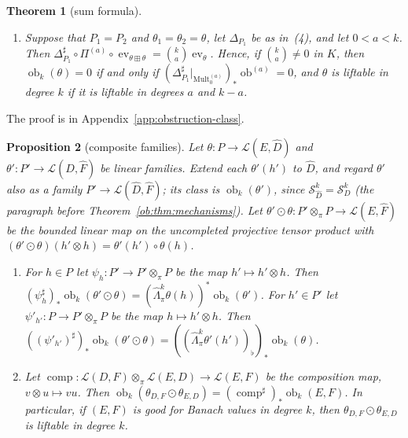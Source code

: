 \documentclass[11pt]{amsart}
\newtheorem{theorem}{Theorem}[section]
\newtheorem{proposition}[theorem]{Proposition}
\theoremstyle{definition}
\theoremstyle{remark}
\numberwithin{equation}{section}
\newcommand{\cL}{\mathcal L}
\newcommand{\Mult}{\operatorname{Mult}}
\theoremstyle{plain}
\theoremstyle{definition}
\theoremstyle{plain}
\newcommand{\ev}{\operatorname{ev}}
\newcommand{\ob}{\operatorname{ob}}
\newcommand{\cS}{\mathcal S}
\begin{document}
\begin{theorem}[sum formula]
\begin{enumerate}
$a$, then $\theta_1+\theta_2=(\theta_1\boxplus\theta_2)\circ\Delta_{P_1}$ is liftable in degree $k$. In particular,
$\theta_1+\theta_2$ is liftable in degree $k$ if $\theta_1$ and $\theta_2$ are liftable in every degree at most $k$.
\item Suppose that $P_1=P_2$ and $\theta_1=\theta_2=\theta$, let $\Delta_{P_1}$ be as in~(4), and let $0<a<k$. Then
$\Delta_{P_1}^\sharp\circ\Pi^{(a)}\circ\ev_{\theta\boxplus\theta}=\binom ka\ev_\theta$. Hence, if $\binom ka\ne0$ in $K$, then
$\ob_k(\theta)=0$ if and only if $(\Delta_{P_1}^\sharp|_{\Mult^{(a)}_0})_*\ob^{(a)}=0$, and $\theta$ is liftable in degree $k$
if it is liftable in degrees $a$ and $k-a$.
\end{enumerate}
\end{theorem}

The proof is in Appendix~\ref{app:obstruction-class}.

\begin{proposition}[composite families]\label{cmb:prop:composition}
Let $\theta\colon P\to\cL(E,\widehat D)$ and $\theta'\colon P'\to\cL(D,\widehat F)$ be linear families. Extend each $\theta'(h')$ to
$\widehat D$, and regard $\theta'$ also as a family $P'\to\cL(\widehat D,\widehat F)$; its class is $\ob_k(\theta')$, since
$\cS^k_{\widehat D}=\cS^k_D$ (the paragraph before Theorem~\ref{ob:thm:mechanisms}). Let
$\theta'\odot\theta\colon P'\otimes_\pi P\to\cL(E,\widehat F)$ be the bounded linear map on the uncompleted projective tensor
product with $(\theta'\odot\theta)(h'\otimes h)=\theta'(h')\circ\theta(h)$.
\begin{enumerate}
\item For $h\in P$ let $\psi_h\colon P'\to P'\otimes_\pi P$ be the map $h'\mapsto h'\otimes h$. Then
$(\psi_h^\sharp)_*\ob_k(\theta'\odot\theta)=(\widehat\Lambda^k_\pi\theta(h))^*\ob_k(\theta')$. For $h'\in P'$ let
$\psi'_{h'}\colon P\to P'\otimes_\pi P$ be the map $h\mapsto h'\otimes h$. Then
$((\psi'_{h'})^\sharp)_*\ob_k(\theta'\odot\theta)=((\widehat\Lambda^k_\pi\theta'(h'))_\flat)_*\ob_k(\theta)$.
\item Let $\operatorname{comp}\colon\cL(D,F)\otimes_\pi\cL(E,D)\to\cL(E,F)$ be the composition map, $v\otimes u\mapsto vu$.
Then $\ob_k(\theta_{D,F}\odot\theta_{E,D})=(\operatorname{comp}^\sharp)_*\ob_k(E,F)$. In particular, if $(E,F)$ is good for
Banach values in degree $k$, then $\theta_{D,F}\odot\theta_{E,D}$ is liftable in degree $k$.
\end{enumerate}
\end{proposition}
\end{document}
